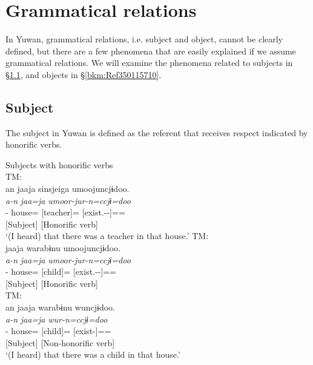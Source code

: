 \chapter{Grammatical relations}\label{chap:3}\hypertarget{RefHeadingToc395696987}{}
In Yuwan, grammatical relations, i.e. subject and object, cannot be clearly defined, but there are a few phenomena that are easily explained if we assume grammatical relations. We will examine the phenomena related to subjects in §\ref{bkm:Ref350115473}, and objects in §\ref{bkm:Ref350115710}.

\section{Subject}
\label{bkm:Ref350115473}\hypertarget{RefHeadingToc395696988}{}
The subject in Yuwan is defined as the referent that receives respect indicated by honorific verbs.

{\smallex
\ea  Subjects with honorific verbs\\
\ea TM:\hfill\relax[El: 120924] \\ \gllll  an  {jaaja}  {sinsjeiga}  {umoojuncjɨdoo.}\\
                {\itshape a-n}  {\itshape jaa=ja}    {\itshape umoor-jur-n=ccjɨ=doo}\\
                {\DIST-\ADNZ}  {house=\TOP}  {[teacher]=\NOM}  {[exist.\HON-\UMRK-\PTCP]=\QT=\ASS}\\
                     {[Subject]} {} {} {[Honorific verb]}\\
\glt ‘(I heard) that there was a teacher in that house.’ 
\ex TM: \hfill\relax [El: 120924]\\   {jaaja}  {warabɨnu}  {umoojuncjɨdoo.}\\
               {\itshape a-n}  {\itshape jaa=ja}    {\itshape umoor-jur-n=ccjɨ=doo}\\
                {\DIST-\ADNZ}  {house=\TOP}  {[child]=\NOM}  {[exist.\HON-\UMRK-\PTCP]=\QT=\ASS}\\
                {[Subject]} {}  {}  {[Honorific verb]}\\

\ex TM:\hfill\relax[El: 120924]\\ \gllll  an  {jaaja}  {warabɨnu}  {wuncjɨdoo.}\\
            {\itshape a-n}  {\itshape jaa=ja}    {\itshape wur-n=ccjɨ=doo}\\
            {\DIST-\ADNZ}  {house=\TOP}  {[child]=\NOM}  {[exist-\PTCP]=\QT=\ASS}\\
             {[Subject]} {}   {}  {[Non-honorific verb]}\\
   \glt  ‘(I heard) that there was a child in that house.’ 
\z
\z}

